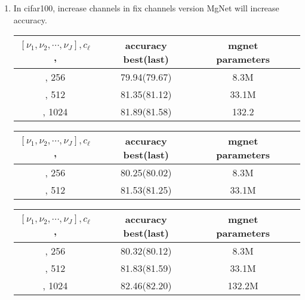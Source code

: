 \begin{enumerate}
\item In cifar100, increase channels in fix channels  version MgNet will increase accuracy.
\begin{table}[!htbp]
	\begin{center}
			\begin{tabular}{|c|c|c|c|}
				\hline
				$[\nu_1,\nu_2,\cdots,\nu_J], c_\ell$,  &  accuracy  best(last) & mgnet parameters \tabularnewline
                \hline
				[2,2,2,2], 256                         &  79.94(79.67)         & 8.3M             \tabularnewline
                \hline
				[2,2,2,2], 512                         &  81.35(81.12)         & 33.1M            \tabularnewline
                \hline
				[2,2,2,2], 1024                        &  81.89(81.58)          & 132.2            \tabularnewline
				\hline
			\end{tabular}
	\end{center}
\end{table}

\begin{table}[!htbp]
	\begin{center}
			\begin{tabular}{|c|c|c|c|}
				\hline
				$[\nu_1,\nu_2,\cdots,\nu_J], c_\ell$,  &  accuracy  best(last) & mgnet parameters \tabularnewline
                \hline
				[4,2,2,2], 256                         &  80.25(80.02)         & 8.3M             \tabularnewline
                \hline
				[4,2,2,2], 512                         &  81.53(81.25)         & 33.1M            \tabularnewline
				\hline
			\end{tabular}
	\end{center}
\end{table}


\begin{table}[!htbp]
	\begin{center}
			\begin{tabular}{|c|c|c|c|}
				\hline
				$[\nu_1,\nu_2,\cdots,\nu_J], c_\ell$,  &  accuracy  best(last) & mgnet parameters \tabularnewline
                \hline
				[8,2,2,2], 256                         &  80.32(80.12)         & 8.3M             \tabularnewline
                \hline
				[8,2,2,2], 512                         &  81.83(81.59)         & 33.1M            \tabularnewline
                \hline
				[8,2,2,2], 1024                        &  82.46(82.20)         & 132.2M           \tabularnewline
				\hline
			\end{tabular}
	\end{center}
\end{table}



\end{enumerate}
